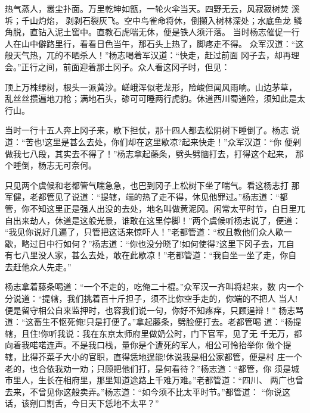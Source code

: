 热气蒸人，嚣尘扑面。万里乾坤如甑，一轮火伞当天。四野无云，风寂寂树焚
溪坼；千山灼焰，剥剥石裂灰飞。空中鸟雀命将休，倒攧入树林深处；水底鱼龙
鳞角脱，直钻入泥土窖中。直教石虎喘无休，便是铁人须汗落。
当时杨志催促一行人在山中僻路里行，看看日色当午，那石头上热了，脚疼走不得。
众军汉道：“这般天气热，兀的不晒杀人！”杨志喝着军汉道：“快走，赶过前面
冈子去，却再理会。”正行之间，前面迎着那土冈子。众人看这冈子时，但见：

顶上万株绿树，根头一派黄沙。嵯峨浑似老龙形，险峻但闻风雨响。山边茅草，
乱丝丝攒遍地刀枪；满地石头，碜可可睡两行虎豹。休道西川蜀道险，须知此是太
行山。

当时一行十五人奔上冈子来，歇下担仗，那十四人都去松阴树下睡倒了。杨志
说道：“苦也!这里是甚么去处，你们却在这里歇凉?起来快走！”众军汉道：“你
便剁做我七八段，其实去不得了！”杨志拿起藤条，劈头劈脑打去，打得这个起来，
那个睡倒，杨志无可奈何。

只见两个虞候和老都管气喘急急，也巴到冈子上松树下坐了喘气。看这杨志打
那军健，老都管见了说道：“提辖，端的热了走不得，休见他罪过。”杨志道：“都
管，你不知这里正是强人出没的去处，地名叫做黄泥冈。闲常太平时节，白日里兀
自出来劫人，休道是这般光景，谁敢在这里停脚！”两个虞候听杨志说了，便道：
“我见你说好几遍了，只管把这话来惊吓人！”老都管道：“权且教他们众人歇一
歇，略过日中行如何？”杨志道：“你也没分晓了!如何使得?这里下冈子去，兀自
有七八里没人家，甚么去处，敢在此歇凉！”老都管道：“我自坐一坐了走，你自
去赶他众人先走。”

杨志拿着藤条喝道：“一个不走的，吃俺二十棍。”众军汉一齐叫将起来，数
内一个分说道：“提辖，我们挑着百十斤担子，须不比你空手走的，你端的不把人
当人!便是留守相公自来监押时，也容我们说一句，你好不知疼痒，只顾逞辩！”
杨志骂道：“这畜生不怄死俺!只是打便了。”拿起藤条，劈脸便打去。老都管喝
道：“杨提辖，且住!你听我说：我在东京太师府里做奶公时，门下官军，见了无
千无万，都向着我喏喏连声。不是我口栈，量你是个遭死的军人，相公可怜抬举你
做个提辖，比得芥菜子大小的官职，直得恁地逞能!休说我是相公家都管，便是村
庄一个老的，也合依我劝一劝；只顾把他们打，是何看待？”杨志道：“都管，你
须是城市里人，生长在相府里，那里知道途路上千难万难。”老都管道：“四川、
两广也曾去来，不曾见你这般卖弄。”杨志道：“如今须不比太平时节。”都管道：
“你说这话，该剜口割舌，今日天下恁地不太平？”

